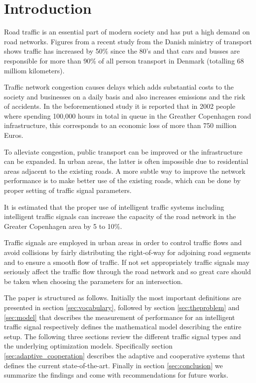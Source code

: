 \section{Introduction}

Road traffic is an essential part of modern society and has put a high
demand on road networks. Figures from a recent study from the Danish
ministry of transport \cite{47} shows traffic has increased by 50\%
since the 80's and that cars and busses are responsible for more than
90\% of all person transport in Denmark (totalling 68 milliom
kilometers).

Traffic network congestion causes delays which adds substantial costs
to the society and businesses on a daily basis and also increases
emissions and the risk of accidents. In the beforementioned study it
is reported that in 2002 people where spending 100,000 hours in total
in queue in the Greather Copenhagen road infrastructure, this
corresponds to an economic loss of more than 750 million Euros.  

To alleviate congestion, public transport can be improved or the
infrastructure can be expanded. In urban areas, the latter is often
impossible due to residential areas adjacent to the existing roads.
A more subtle way to improve the network performance is to make better
use of the existing roads, which can be done by proper setting of
traffic signal parameters.

It is estimated that the proper use of intelligent traffic systems
including intelligent traffic signals can increase the capacity of the
road network in the Greater Copenhagen area by 5 to 10\%.

Traffic signals are employed in urban areas in order to control
traffic flows and avoid collisions by fairly distributing the
right-of-way for adjoining road segments and to ensure a smooth flow
of traffic. If not set appropriately traffic signals may seriously
affect the traffic flow through the road network and so great care
should be taken when choosing the parameters for an intersection.

The paper is structured as follows. Initially the most important
definitions are presented in section \ref{sec:vocabulary}, followed by
section \ref{sec:theproblem} and \ref{sec:model} that describes the
measurement of performance for an intelligent traffic signal
respectively defines the mathematical model describing the entire
setup. The following three sections review the different traffic
signal types and the underlying optimization models. Specifically
section \ref{sec:adaptive_cooperation} describes the adaptive and
cooperative systems that defines the current state-of-the-art. Finally
in section \ref{sec:conclusion} we summarize the findings and come
with recommendations for future works.
